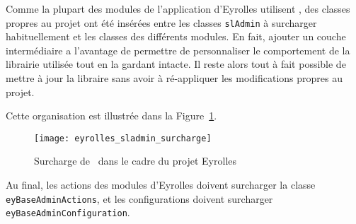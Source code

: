 Comme la plupart des modules de l'application d'Eyrolles utilisent \asladmin, des classes propres au projet ont été insérées entre les classes \texttt{slAdmin} à surcharger habituellement et les classes des différents modules. En fait, ajouter un couche intermédiaire a l'avantage de permettre de personnaliser le comportement de la librairie utilisée tout en la gardant intacte. Il reste alors tout à fait possible de mettre à jour la libraire sans avoir à ré-appliquer les modifications propres au projet.

Cette organisation est illustrée dans la Figure~\ref{figure:eyrolles_sladmin_surcharge}.

\begin{figure}
	\centering
	\texttt{[image: eyrolles\_sladmin\_surcharge]}
	\caption{Surcharge de \asladmin\ dans le cadre du projet Eyrolles}
	\label{figure:eyrolles_sladmin_surcharge}
\end{figure}

Au final, les actions des modules d'Eyrolles doivent surcharger la classe \texttt{eyBaseAdminActions}, et les configurations doivent surcharger\\ \texttt{eyBaseAdminConfiguration}.
